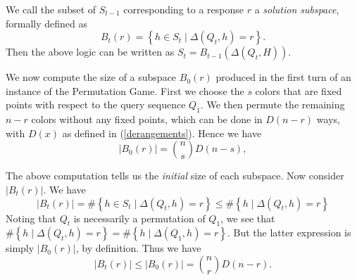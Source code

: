 \documentclass[12pt, a4paper]{article}
\begin{document}
	We call the subset of $S_{t-1}$ corresponding to a response $r$ a \textit{solution subspace}, formally defined as 
	\begin{equation*}
		B_t(r) = \left\{h\in S_t\mid \Delta(Q_t, h) = r\right\}.
	\end{equation*}
	Then the above logic can be written as $S_t = B_{t-1}(\Delta(Q_t,H))$.
	
	We now compute the size of a subspace $B_0(r)$ produced in the first turn of an instance of the Permutation Game. First we choose the $s$ colors that are fixed points with respect to the query sequence $Q_1$. We then permute the remaining $n-r$ colors without any fixed points, which can be done in $D(n - r)$ ways, with $D(x)$ as defined in (\ref{derangements}). Hence we have
	\begin{equation*}
		|B_0(r)| = \binom{n}{s}D(n-s),
	\end{equation*}
	
	The above computation tells us the \textit{initial} size of each subspace. Now consider $|B_t(r)|$. We have 
	\begin{equation*}
	|B_t(r)| = \#\left\{h\in S_t\mid \Delta(Q_t, h) = r\right\} \leq \#\left\{h\mid \Delta(Q_t, h) = r\right\}
	\end{equation*} 
	Noting that $Q_t$ is necessarily a permutation of $Q_1$, we see that $\#\left\{h\mid \Delta(Q_t, h) = r\right\} = \#\left\{h\mid \Delta(Q_1, h) = r\right\}$. But the latter expression is simply $|B_0(r)|$, by definition. Thus we have
	\begin{equation*}
		|B_t(r)|\le |B_0(r)| = \binom{n}{r}D(n-r).
	\end{equation*}
\end{document}
